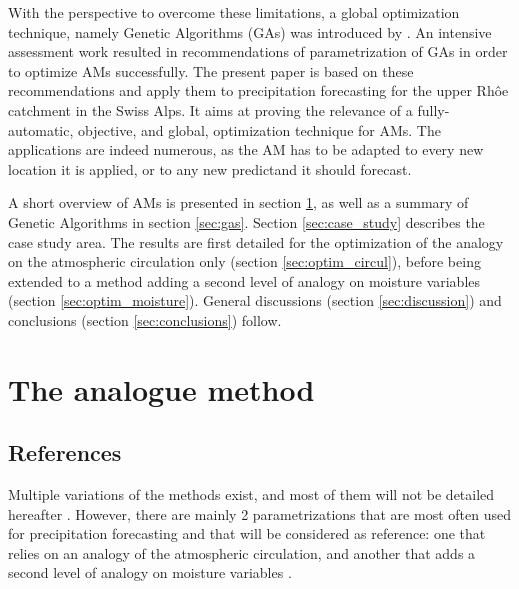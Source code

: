 \documentclass[5p]{elsarticle}
\begin{document}
With the perspective to overcome these limitations, a global optimization technique, namely Genetic Algorithms (GAs) was introduced by \citet{Horton2016a}. An intensive assessment work resulted in recommendations of parametrization of GAs in order to optimize AMs successfully. The present paper is based on these recommendations and apply them to precipitation forecasting for the upper Rh\^{o}e catchment in the Swiss Alps. It aims at proving the relevance of a fully-automatic, objective, and global, optimization technique for AMs. The applications are indeed numerous, as the AM has to be adapted to every new location it is applied, or to any new predictand it should forecast.

A short overview of AMs is presented in section \ref{sec:analog_method}, as well as a summary of Genetic Algorithms in section \ref{sec:gas}. Section \ref{sec:case_study} describes the case study area. The results are first detailed for the optimization of the analogy on the atmospheric circulation only (section \ref{sec:optim_circul}), before being extended to a method adding a second level of analogy on moisture variables (section \ref{sec:optim_moisture}). General discussions (section \ref{sec:discussion}) and conclusions (section \ref{sec:conclusions}) follow.


\section{The analogue method}
\label{sec:analog_method}

\subsection{References}
\label{sec:references}

Multiple variations of the methods exist, and most of them will not be detailed hereafter \cite[see][for more comprehensive listings]{Horton2016, BenDaoud2015}. However, there are mainly 2 parametrizations that are most often used for precipitation forecasting and that will be considered as reference: one that relies on an analogy of the atmospheric circulation, and another that adds a second level of analogy on moisture variables \citep{Obled2002, Bontron2005, Marty2012}.
\end{document}
